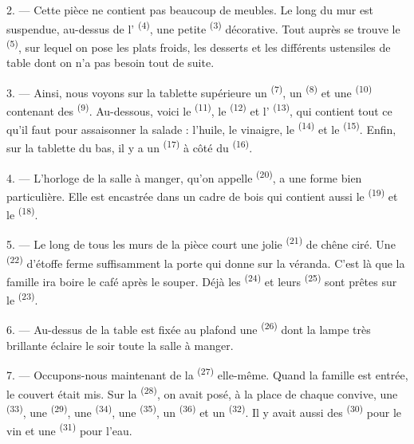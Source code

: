 2. --- Cette pièce ne contient pas beaucoup de meubles. Le long du mur est
suspendue, au-dessus de l' \textsuperscript{(4)}, une petite
 \textsuperscript{(3)} décorative. Tout auprès se trouve le
 \textsuperscript{(5)}, sur lequel on pose les plats froids,
les desserts et les différents ustensiles de table dont on n'a pas besoin tout
de suite.

3. --- Ainsi, nous voyons sur la tablette supérieure un 
\textsuperscript{(7)}, un  \textsuperscript{(8)} et une
 \textsuperscript{(10)} contenant des 
\textsuperscript{(9)}. Au-dessous, voici le 
\textsuperscript{(11)}, le  \textsuperscript{(12)} et
l' \textsuperscript{(13)}, qui contient tout ce qu'il faut pour
assaisonner la salade : l'huile, le vinaigre, le 
\textsuperscript{(14)} et le  \textsuperscript{(15)}. Enfin, sur
la tablette du bas, il y a un  \textsuperscript{(17)} à côté du
 \textsuperscript{(16)}.

4. --- L'horloge de la salle à manger, qu'on appelle 
\textsuperscript{(20)}, a une forme bien particulière. Elle est encastrée dans
un cadre de bois qui contient aussi le 
\textsuperscript{(19)} et le  \textsuperscript{(18)}.

\VUsaut{4.6mm}
\VUsaut{3.0mm}

5. --- Le long de tous les murs de la pièce court une jolie 
\textsuperscript{(21)} de chêne ciré. Une 
\textsuperscript{(22)} d'étoffe ferme suffisamment la porte qui donne sur la
véranda. C'est là que la famille ira boire le café après le souper. Déjà les
 \textsuperscript{(24)} et leurs 
\textsuperscript{(25)} sont prêtes sur le  \textsuperscript{(23)}.

6. --- Au-dessus de la table est fixée au plafond une 
\textsuperscript{(26)} dont la lampe très brillante éclaire le soir toute la
salle à manger.

7. --- Occupons-nous maintenant de la  \textsuperscript{(27)}
elle-même. Quand la famille est entrée, le couvert était mis. Sur la
 \textsuperscript{(28)}, on avait posé, à la place de chaque
convive, une  \textsuperscript{(33)}, une
 \textsuperscript{(29)}, une 
\textsuperscript{(34)}, une  \textsuperscript{(35)}, un
 \textsuperscript{(36)} et un 
\textsuperscript{(32)}. Il y avait aussi des 
\textsuperscript{(30)} pour le vin et une 
\textsuperscript{(31)} pour l'eau.

